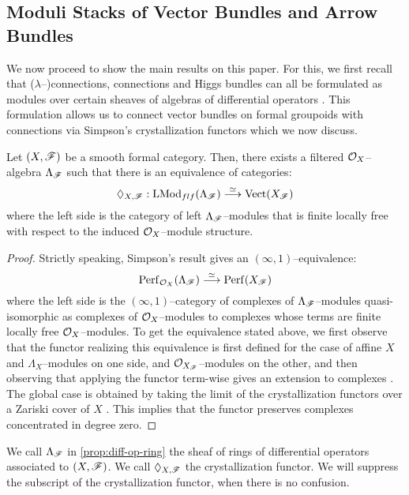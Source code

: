 \documentclass[11pt]{amsart}
\begin{document}
\subsection{Moduli Stacks of Vector Bundles and Arrow Bundles}

We now proceed to show the main results on this paper. For this, we first
recall that ($\lambda$--)connections, connections and Higgs bundles can
all be formulated as modules over certain sheaves of algebras of differential
operators \cite[\S 2]{ModRepFunGrpI}. This formulation allows us to connect
vector bundles on formal groupoids with connections via
Simpson's crystallization functors which we now discuss.

\begin{prop}\label{prop:diff-op-ring}
Let $(X, \mathscr{F})$ be a smooth formal category. Then, there exists
a filtered $\mathcal{O}_X$--algebra $\Lambda_\mathscr{F}$ such that there is an equivalence
of categories:
\[
\Diamond_{X, \sF} : \LMod_{flf}(\Lambda_\sF) \to[\simeq] \Vect(X_\sF)
\]
where the left side is the category of left $\Lambda_\mathscr{F}$--modules that is
finite locally free with respect to the induced $\mathcal{O}_X$--module structure.
\end{prop}
\begin{proof}
Strictly speaking, Simpson's result gives an $(\infty, 1)$--equivalence:
\[
\Perf_{\mcO_X}(\Lambda_\sF) \to[\simeq] \Perf(X_\sF)
\]
where the left side is the $(\infty, 1)$--category of complexes of
$\Lambda_\mathscr{F}$--modules quasi-isomorphic as complexes of $\mathcal{O}_X$--modules
to complexes whose terms are finite locally free $\mathcal{O}_X$--modules.
To get the equivalence stated above, we first observe that the functor
realizing this equivalence is first defined for the case of affine $X$
and $\Lambda_X$--modules on one side, and $\mathcal{O}_{X_\mathscr{F}}$--modules on the other,
and then observing that applying the functor term-wise gives an extension
to complexes \cite[\S 3.5, p. 24]{GeomNonAbHodgeFilt}. The global case
is obtained by taking the limit of the crystallization functors over a Zariski
cover of $X$ \cite[Proof of Theorem 5.1]{GeomNonAbHodgeFilt}.
This implies that the functor preserves complexes concentrated in degree zero.
\end{proof}

\begin{defn}\label{defn:diff-op-ring}
We call $\Lambda_\mathscr{F}$ in \cref{prop:diff-op-ring} the sheaf of rings
of differential operators associated to $(X, \mathscr{F})$. We call $\Diamond_{X, \mathscr{F}}$
the crystallization functor.
We will suppress the subscript of the crystallization functor, when there is
no confusion.
\end{defn}
\end{document}
